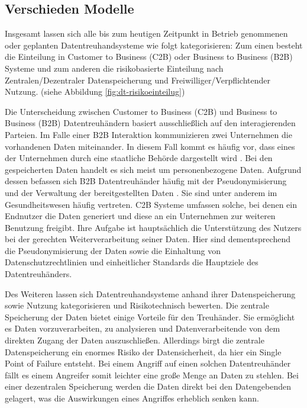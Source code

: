 \documentclass[
	fontsize=12pt,
	headings=small,
	parskip=half,           %
	bibliography=totoc,
	numbers=noenddot,       %
	open=any,               %
]{scrreprt}
\begin{document}
\subsection{Verschieden Modelle}
Insgesamt lassen sich alle bis zum heutigen Zeitpunkt in Betrieb genommenen oder geplanten Datentreuhandsysteme wie folgt kategorisieren: Zum einen besteht die Einteilung in Customer to Business (C2B) oder Business to Business (B2B) Systeme und zum anderen die risikobasierte Einteilung nach Zentralen/Dezentraler Datenspeicherung und Freiwilliger/Verpflichtender Nutzung. (siehe Abbildung \ref{fig:dt-risikoeinteilug})

Die Unterscheidung zwischen Customer to Business (C2B) und Business to Business (B2B) Datentreuhändern basiert ausschließlich auf den interagierenden Parteien. Im Falle einer B2B Interaktion kommunizieren zwei Unternehmen die vorhandenen Daten miteinander. In diesem Fall kommt es häufig vor, dass eines der Unternehmen durch eine staatliche Behörde dargestellt wird . Bei den gespeicherten Daten handelt es sich meist um personenbezogene Daten. Aufgrund dessen befassen sich B2B Datentreuhänder häufig mit der Pseudonymisierung und der Verwaltung der bereitgestellten Daten . Sie sind unter anderem im Gesundheitswesen häufig vertreten. \cite{dt-blankertz2020datentreuhandmodelle}
C2B Systeme umfassen solche, bei denen ein Endnutzer die Daten generiert und diese an ein Unternehmen zur weiteren Benutzung freigibt. Ihre Aufgabe ist hauptsächlich die Unterstützung des Nutzers bei der gerechten Weiterverarbeitung seiner Daten. \cite{dt-blankertz2020datentreuhandmodelle} Hier sind dementsprechend die Pseudonymisierung der Daten sowie die Einhaltung von Datenschutzrechtlinien und einheitlicher Standards die Hauptziele des Datentreuhänders.

Des Weiteren lassen sich Datentreuhandsysteme anhand ihrer Datenspeicherung sowie Nutzung kategorisieren und Risikotechnisch bewerten. Die zentrale Speicherung der Daten bietet einige Vorteile für den Treuhänder. Sie ermöglicht es Daten vorzuverarbeiten, zu analysieren und Datenverarbeitende von dem direkten Zugang der Daten auszuschließen. Allerdings birgt die zentrale Datenspeicherung ein enormes Risiko der Datensicherheit, da hier ein Single Point of Failure entsteht. Bei einem Angriff auf einen solchen Datentreuhänder fällt es einem Angreifer somit leichter eine große Menge an Daten zu stehlen. Bei einer dezentralen Speicherung werden die Daten direkt bei den Datengebenden gelagert, was die Auswirkungen eines Angriffes erheblich senken kann. 
\\
\end{document}
